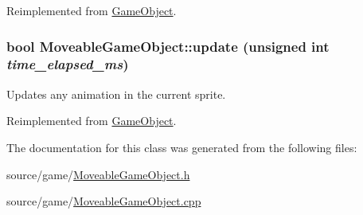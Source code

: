 Reimplemented from \hyperlink{classGameObject_abb64143e72358beb808db22182517802}{GameObject}.\hypertarget{classMoveableGameObject_af2a5d981743e85b4bd35a90f874b361b}{
\subsubsection[{update}]{\setlength{\rightskip}{0pt plus 5cm}bool MoveableGameObject::update (unsigned int {\em time\_\-elapsed\_\-ms})}}
\label{classMoveableGameObject_af2a5d981743e85b4bd35a90f874b361b}
Updates any animation in the current sprite. 

Reimplemented from \hyperlink{classGameObject_ad2f3cd5d1f5a11b237507cd3ee98b95d}{GameObject}.

The documentation for this class was generated from the following files:\begin{DoxyCompactItemize}
\item 
source/game/\hyperlink{MoveableGameObject_8h}{MoveableGameObject.h}\item 
source/game/\hyperlink{MoveableGameObject_8cpp}{MoveableGameObject.cpp}\end{DoxyCompactItemize}
